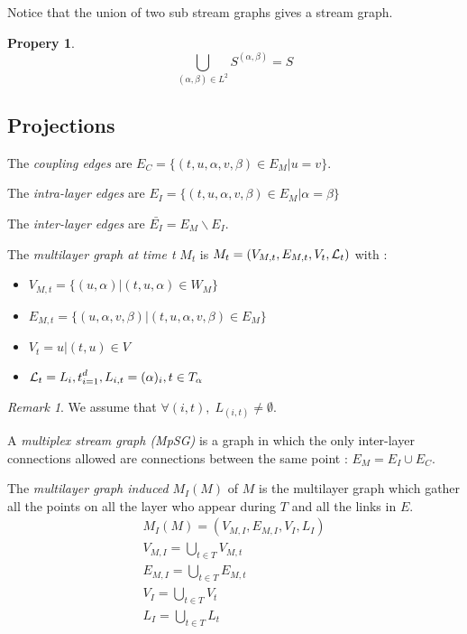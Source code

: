 \documentclass[dvipsnames,a4paper,11pt]{article}
\newtheorem{prop}{Propery}
\theoremstyle{definition}
\theoremstyle{remark}
\newtheorem{rmq}{Remark}
\begin{document}
	Notice that the union of two sub stream graphs gives a stream graph.
	
	\begin{prop}
		\[
			\bigcup_{(\alpha,\beta) \in L^2} S^{(\alpha,\beta)} = S
		\]
	\end{prop}
	
	\subsection{Projections }
	
    The {\em coupling edges} are $E_C=\{(t,u,\alpha,v,\beta)\in E_M | u=v\}$.
    
    The {\em intra-layer edges} are $E_I = \{(t,u,\alpha,v,\beta) \in E_M | \alpha = \beta \}$
    
    The {\em inter-layer edges} are $\bar{E_I} = E_M\backslash E_I$.
    
   	The {\em multilayer graph at time t} $M_t$ is $M_t = (V_{M,t}, E_{M,t},V_t,{\cal L}_t)$ with : 
    \begin{itemize}
		\item $V_{M,t} = \{(u,\alpha)| (t,u,\alpha)\in W_M\}$
		\item $E_{M,t} = \{(u,\alpha,v,\beta) | (t,u,\alpha,v,\beta) \in E_M\}$
		\item $V_t = {u | (t,u) \in V}$
		\item ${\cal L}_t = {L_i,t}_{i=1}^d, L_{i,t}=(\alpha)_i, t\in T_\alpha$
    \end{itemize}
    
    \begin{rmq}
    	We assume that $\forall (i,t), \; L_{(i,t)} \neq \emptyset$.
    \end{rmq}
    
    A {\em multiplex stream graph (MpSG)} is a graph in which the only inter-layer connections allowed are connections between the same point : $E_M = E_I \cup E_C$.
    
    The {\em multilayer graph induced} $M_I(M)$ of $M$ is the multilayer graph which gather all the points on all the layer who appear during $T$ and all the links in $E$.
    \begin{align*}
    	M_I(M) = (V_{M,I}, E_{M,I}, V_I,L_I)\\
    	V_{M,I} = \bigcup_{t\in T} V_{M,t}\\
    	E_{M,I} = \bigcup_{t\in T} E_{M,t}\\
    	V_I = \bigcup_{t\in T} V_t \\
    	L_I = \bigcup_{t\in T} L_t\\
    \end{align*}
	
\end{document}
